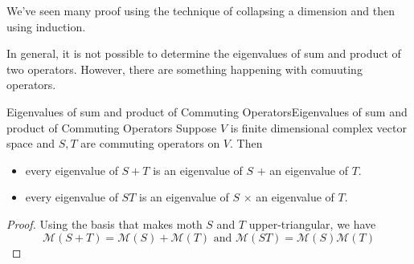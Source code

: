 \documentclass[../main.tex]{subfiles}
\begin{document}
\begin{remark}
We've seen many proof using the technique of collapsing a dimension and then using induction.

In general, it is not possible to determine the eigenvalues of sum and product of two operators. However, there are something happening with comuuting operators.
\end{remark}
\begin{theorem}{Eigenvalues of sum and product of Commuting Operators}{Eigenvalues of sum and product of Commuting Operators}
Suppose $V$ is finite dimensional complex vector space and $S,T$ are commuting operators on $V$. Then
\begin{itemize}
\item every eigenvalue of $S+T$ is an eigenvalue of  $S$ $+$ an eigenvalue of $T$.
\item every eigenvalue of $ST$ is an eigenvalue of  $S$ $\times $ an eigenvalue of $T$.
\end{itemize}
\end{theorem}
\begin{proof}
Using the basis that makes moth $S$ and $T$ upper-triangular, we have
\begin{equation*}
\mathscr{M}(S+T) = \mathscr{M}(S)+\mathscr{M}(T) \text{ and }\mathscr{M}(S T) = \mathscr{M}(S) \mathscr{M}(T)
\end{equation*}
\end{proof}
\end{document}
